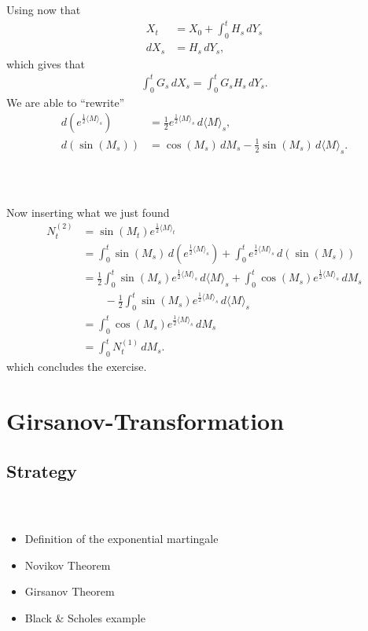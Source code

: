 \documentclass{beamer}
\numberwithin{equation}{section}
\newenvironment{frame2}{\begin{frame}\frametitle{{\normalsize \secname} \\ {\large \subsecname}}}{\end{frame}}
\begin{document}
\begin{frame2}
    Using now that
    \begin{align*}
        X_t &= X_0 + \int_0^t H_s \, dY_s \\
        dX_s &= H_s \, dY_s, 
    \end{align*}
    which gives that
    \begin{align*}
        \int_0^t G_s \, d X_s = \int_0^t G_s H_s \, dY_s.
    \end{align*}
    We are able to ``rewrite''
    \begin{align*}
        d\left(e^{\frac{1}{2}\langle M \rangle_s}\right) &= \frac{1}{2}e^{\frac{1}{2}\langle M \rangle_s} \, d \langle M \rangle_s, \\
        d \left(\sin(M_s)\right) &= \cos(M_s) \, dM_s - \frac{1}{2}\sin(M_s)\, d\langle M \rangle_s.
    \end{align*}
\end{frame2}

\begin{frame2}
    Now inserting what we just found
    \begin{align*}
        N_t^{(2)} &= \sin(M_t)e^{\frac{1}{2}\langle M \rangle_t} \\
       &= \int_0^t \sin(M_s) \, d\left(e^{\frac{1}{2}\langle M \rangle_s}\right) + \int_0^t e^{\frac{1}{2}\langle M \rangle_s} \, d \left(\sin(M_s)\right) \\
       &= \frac{1}{2}\int_0^t\sin(M_s)e^{\frac{1}{2}\langle M \rangle_s}\, d\langle M \rangle_s + \int_0^t\cos(M_s)e^{\frac{1}{2}\langle M \rangle_s}\, dM_s \\
       &\qquad - \frac{1}{2}\int_0^t\sin(M_s)e^{\frac{1}{2}\langle M \rangle_s}\, d\langle M \rangle_s \\
       &= \int_0^t\cos(M_s)e^{\frac{1}{2}\langle M \rangle_s}\, dM_s \\
       &= \int_0^tN_t^{(1)} \, dM_s.
   \end{align*}
   which concludes the exercise.
\end{frame2}

\section{Girsanov-Transformation}

\subsection{Strategy}
\begin{frame2}
    \begin{itemize}
        \item Definition of the exponential martingale
        \item Novikov Theorem
        \item Girsanov Theorem
        \item Black \& Scholes example
    \end{itemize}
\end{frame2}
\end{document}
